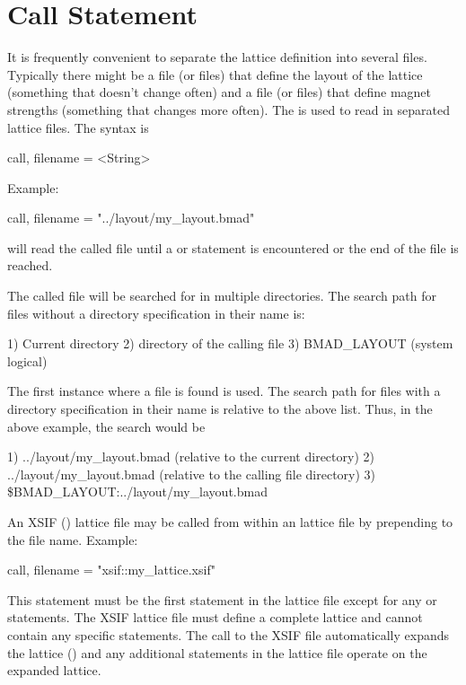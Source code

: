 \section{Call Statement}
\label{s:call}

It is frequently convenient to separate the lattice definition into
several files.  Typically there might be a file (or files) that define
the layout of the lattice (something that doesn't change often) and a
file (or files) that define magnet strengths (something that changes
more often).  The  is used to read in separated lattice
files. The syntax is
\begin{example}
  call, filename = <String>
\end{example}
Example:
\begin{example}
  call, filename = "../layout/my_layout.bmad"
\end{example}
\bmad will read the called file until a  or 
statement is encountered or the end of the file is reached.

The called file will be searched for in multiple directories.
The search path for files without a directory specification in their name is:
\begin{example}
	1) Current directory
	2) directory of the calling file
	3) BMAD_LAYOUT (system logical)
\end{example}
The first instance where a file is found is used.
The search path for files with a directory specification in their name
is relative to the above list. Thus, in the above example, the search
would be
\begin{example}
  1) ../layout/my_layout.bmad  (relative to the current directory)
  2) ../layout/my_layout.bmad  (relative to the calling file directory)
  3) \$BMAD_LAYOUT:../layout/my_layout.bmad 
\end{example}

An XSIF () lattice file may be called
from within an \bmad lattice file by prepending  to the
file name. Example:
\begin{example}
  call, filename = "xsif::my_lattice.xsif"
\end{example}
This statement must be the first statement in the \bmad lattice file
except for any  or  statements. The
XSIF lattice file must define a complete lattice and cannot contain
any \bmad specific statements. The call to the XSIF file automatically
expands the lattice () and any additional statements in
the \bmad lattice file operate on the expanded lattice.

